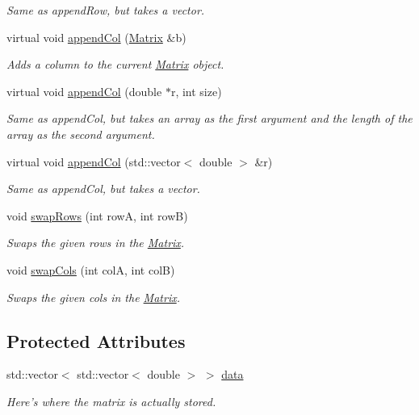 \begin{CompactItemize}
\begin{CompactList}\small\item\em Same as appendRow, but takes a vector. \item\end{CompactList}\item 
virtual void \hyperlink{class_matrix_6d7061bb02cf34f6c79a01ff25b41e84}{appendCol} (\hyperlink{class_matrix}{Matrix} \&b)
\begin{CompactList}\small\item\em Adds a column to the current \hyperlink{class_matrix}{Matrix} object. \item\end{CompactList}\item 
virtual void \hyperlink{class_matrix_ae8efe9de26740e3c953e43de55963b2}{appendCol} (double $\ast$r, int size)
\begin{CompactList}\small\item\em Same as appendCol, but takes an array as the first argument and the length of the array as the second argument. \item\end{CompactList}\item 
virtual void \hyperlink{class_matrix_726f7ae83284c090af821752628974af}{appendCol} (std::vector$<$ double $>$ \&r)
\begin{CompactList}\small\item\em Same as appendCol, but takes a vector. \item\end{CompactList}\item 
void \hyperlink{class_matrix_c0e73d5e98817e12b82a3f626c8343de}{swapRows} (int rowA, int rowB)
\begin{CompactList}\small\item\em Swaps the given rows in the \hyperlink{class_matrix}{Matrix}. \item\end{CompactList}\item 
void \hyperlink{class_matrix_505f924baa7c236280751499da56ecee}{swapCols} (int colA, int colB)
\begin{CompactList}\small\item\em Swaps the given cols in the \hyperlink{class_matrix}{Matrix}. \item\end{CompactList}\end{CompactItemize}
\subsection*{Protected Attributes}
\begin{CompactItemize}
\item 
std::vector$<$ std::vector$<$ double $>$ $>$ \hyperlink{class_matrix_dab4557133e13b08ae470a8e5df7b99c}{data}
\begin{CompactList}\small\item\em Here's where the matrix is actually stored. \item\end{CompactList}\end{CompactItemize}


